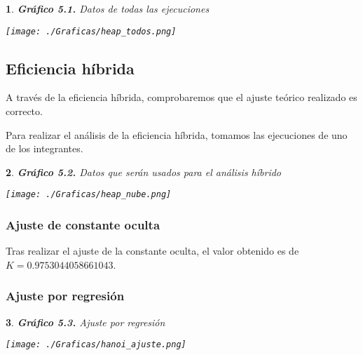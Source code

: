 \documentclass[10pt, a4paper]{article}
\theoremstyle{theorem-style}
\newtheorem*{datos}{}
\theoremstyle{theorem-style}
\theoremstyle{definition-style}
\theoremstyle{remark-style}
\theoremstyle{example-style}
\theoremstyle{definition-style}
\theoremstyle{remark-style}
\begin{document}
\begin{datos}\hspace{-0.2cm}
	{\bf\sffamily Gráfico 5.1.} {\sffamily Datos de todas las ejecuciones}\\
	\vspace{-0.7cm}
	\begin{center}
		\texttt{[image: ./Graficas/heap\_todos.png]}
	\end{center}
\end{datos}

\subsection{Eficiencia híbrida}

A través de la eficiencia híbrida, comprobaremos que el ajuste teórico realizado es correcto.

Para realizar el análisis de la eficiencia híbrida, tomamos las ejecuciones de uno de los integrantes.

\begin{datos}
	{\bf\sffamily Gráfico 5.2.} {\sffamily Datos que serán usados para el análisis híbrido}\\
	\vspace{-0.7cm}
	\begin{center}
		\texttt{[image: ./Graficas/heap\_nube.png]}
	\end{center}	
\end{datos}

\subsubsection{Ajuste de constante oculta}

Tras realizar el ajuste de la constante oculta, el valor obtenido es de $K=0.9753044058661043$.
\pagebreak
\subsubsection{Ajuste por regresión}

\begin{datos}
	{\bf\sffamily Gráfico 5.3.} {\sffamily Ajuste por regresión}\\
	\vspace{-0.7cm}
	\begin{center}
		\texttt{[image: ./Graficas/hanoi\_ajuste.png]}
	\end{center}	
\end{datos}
\end{document}
